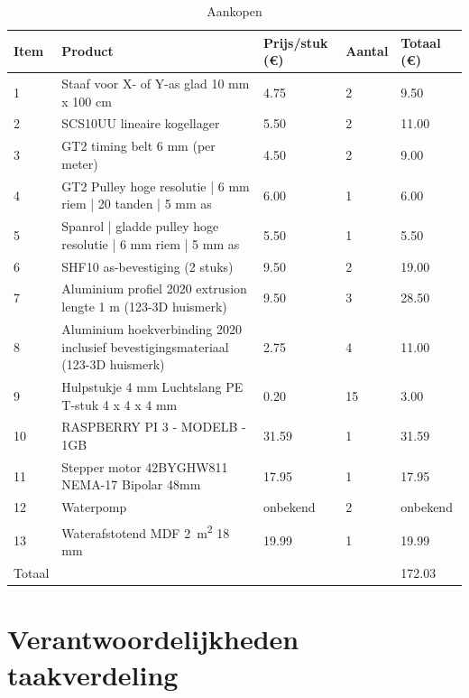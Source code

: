 \documentclass[a4paper,twoside,kulak]{kulakreport} %
\begin{document}
\begin{table}[!hbt]
	\noindent\makebox[\textwidth]
	\sffamily
	
	\caption{Aankopen}
		\begin{tabular}{|p{1cm}|p{5cm}|p{2cm}|p{2cm}|p{2cm}|}
			
		
		
		\toprule
		  Item & Product & Prijs/stuk (\euro) & Aantal & Totaal (\euro)   \\ \midrule
		1 & Staaf voor X- of Y-as
			glad 10 mm x 100 cm & 4.75 & 2 & 9.50 \\
		2 & SCS10UU lineaire kogellager  & 5.50 & 2 & 11.00 \\
		3 & GT2 timing belt 6 mm (per meter)  & 4.50 & 2 & 9.00 \\
		4 & GT2 Pulley hoge resolutie | 6 mm riem | 20 tanden | 5 mm as & 6.00 & 1 & 6.00 \\
		5 & Spanrol | gladde pulley hoge resolutie | 6 mm riem | 5 mm as & 5.50 & 1 & 5.50 \\
		6 & SHF10 as-bevestiging (2 stuks) & 9.50 & 2 & 19.00 \\
		7 & Aluminium profiel 2020 extrusion lengte 1 m (123-3D huismerk)  & 9.50 & 3 & 28.50 \\
		8 & Aluminium hoekverbinding 2020 inclusief bevestigingsmateriaal (123-3D huismerk) & 2.75 & 4 & 11.00 \\
		9 & Hulpstukje 4 mm Luchtslang PE T-stuk 4 x 4 x 4 mm & 0.20 & 15 & 3.00 \\
		10 & RASPBERRY PI 3 - MODELB - 1GB  & 31.59 & 1 & 31.59 \\
		11 & Stepper motor 42BYGHW811 NEMA-17 Bipolar 48mm & 17.95 & 1 & 17.95 \\
		12 & Waterpomp & onbekend & 2 & onbekend \\
		13 & Waterafstotend MDF \SI{2}{\metre\squared} 18 mm & 19.99 & 1 & 19.99 \\
		  
		\bottomrule
		
		Totaal & & & & 172.03 \\
		\bottomrule
	\end{tabular}
	\label{tab:financieelVerslag}

	
\end{table}


\clearpage

\section*{Verantwoordelijkheden taakverdeling}
\end{document}
